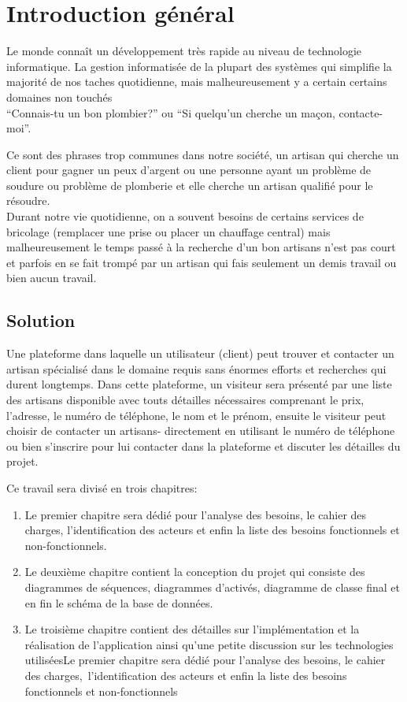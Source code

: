 \section{Introduction général}

Le monde connaît un développement très rapide au niveau de technologie informatique. La gestion informatisée de la plupart des systèmes qui simplifie la majorité de nos taches quotidienne, mais malheureusement y a certain certains domaines non touchés\\
``Connais-tu un bon plombier?''
\hfill
ou
\hfill
``Si quelqu’un cherche un maçon, contacte-moi''.

\noindent Ce sont des phrases trop communes dans notre société, un artisan qui cherche un client pour gagner un peux d'argent ou une personne ayant un problème de soudure ou problème de plomberie et elle cherche un artisan qualifié pour le résoudre.\\

Durant notre vie quotidienne, on a souvent besoins de certains services de bricolage (remplacer une prise ou placer un chauffage central) mais malheureusement le temps passé à la recherche d’un bon artisans n’est pas court et parfois en se fait trompé par un artisan qui fais seulement un demis travail ou bien aucun travail.
\subsection*{Solution}
Une plateforme dans laquelle un utilisateur (client) peut trouver et contacter un artisan spécialisé dans le domaine requis sans énormes efforts et recherches qui durent longtemps.
Dans cette plateforme, un visiteur sera présenté par une liste des artisans disponible avec touts détailles nécessaires comprenant le prix, l’adresse, le numéro de téléphone, le nom et le prénom, ensuite le visiteur peut choisir de contacter un artisans- directement en utilisant le numéro de téléphone ou bien s’inscrire pour lui contacter dans la plateforme et discuter les détailles du projet.

Ce travail sera divisé en trois chapitres:
\begin{enumerate}
	\item Le premier chapitre sera dédié pour l’analyse des besoins, le cahier des charges, l'identification des acteurs et enfin la liste des besoins fonctionnels et non-fonctionnels.
	\item Le deuxième chapitre contient la conception du projet qui consiste des diagrammes de séquences, diagrammes d’activés, diagramme de classe final et en fin le schéma de la base de données.
	\item Le troisième chapitre contient des détailles sur l’implémentation et la réalisation de l’application ainsi qu’une petite discussion sur les technologies utiliséesLe premier chapitre sera dédié pour l’analyse des besoins, le cahier des charges, l’identification des acteurs et enfin la liste des besoins fonctionnels et non-fonctionnels
\end{enumerate}
